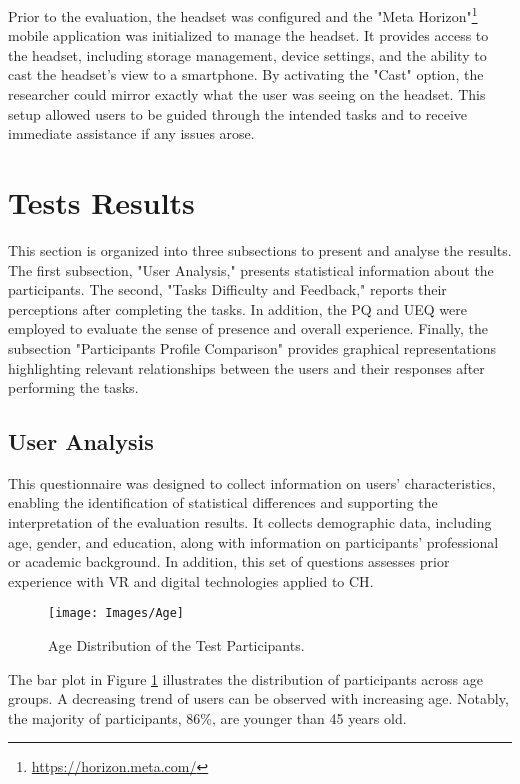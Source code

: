 Prior to the evaluation, the headset was configured and the "Meta Horizon"\footnote{\url{https://horizon.meta.com/}} mobile application was initialized to manage the headset. 
It provides access to the headset, including storage management, device settings, and the ability to cast the headset's view to a smartphone.
By activating the "Cast" option, the researcher could mirror exactly what the user was seeing on the headset.
This setup allowed users to be guided through the intended tasks and to receive immediate assistance if any issues arose.

\section{Tests Results}
\label{sec:results}
This section is organized into three subsections to present and analyse the results. 
The first subsection, "User Analysis," presents statistical information about the participants. 
The second, "Tasks Difficulty and Feedback," reports their perceptions after completing the tasks. 
In addition, the \gls{PQ} and \gls{UEQ} were employed to evaluate the sense of presence and overall experience. 
Finally, the subsection "Participants Profile Comparison" provides graphical representations highlighting relevant relationships between the users and their responses after performing the tasks.

\subsection{User Analysis}
This questionnaire was designed to collect information on users' characteristics, enabling the identification of statistical differences and supporting the interpretation of the evaluation results. It collects demographic data, including age, gender, and education, along with information on participants' professional or academic background. 
In addition, this set of questions assesses prior experience with \gls{VR} and digital technologies applied to \gls{CH}.

\begin{figure}[h!]
    \centering
    \texttt{[image: Images/Age]}
    \caption{Age Distribution of the Test Participants.} 
    \label{fig:age}
\end{figure}

The bar plot in Figure \ref{fig:age} illustrates the distribution of participants across age groups. A decreasing trend of users can be observed with increasing age. Notably, the majority of participants, 86\%, are younger than 45 years old.

